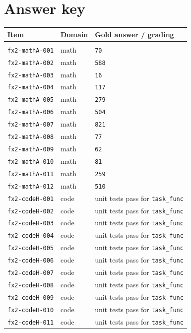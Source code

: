 \documentclass[10pt]{article}
\begin{document}
\newpage
\section{Answer key}
\begin{tabular}{llp{3.4in}}
\textbf{Item} & \textbf{Domain} & \textbf{Gold answer / grading}\\
\hline\\[-8pt]
\texttt{fx2-mathA-001} & math & \texttt{70}\\
\texttt{fx2-mathA-002} & math & \texttt{588}\\
\texttt{fx2-mathA-003} & math & \texttt{16}\\
\texttt{fx2-mathA-004} & math & \texttt{117}\\
\texttt{fx2-mathA-005} & math & \texttt{279}\\
\texttt{fx2-mathA-006} & math & \texttt{504}\\
\texttt{fx2-mathA-007} & math & \texttt{821}\\
\texttt{fx2-mathA-008} & math & \texttt{77}\\
\texttt{fx2-mathA-009} & math & \texttt{62}\\
\texttt{fx2-mathA-010} & math & \texttt{81}\\
\texttt{fx2-mathA-011} & math & \texttt{259}\\
\texttt{fx2-mathA-012} & math & \texttt{510}\\
\texttt{fx2-codeH-001} & code & unit tests pass for \texttt{task\_func}\\
\texttt{fx2-codeH-002} & code & unit tests pass for \texttt{task\_func}\\
\texttt{fx2-codeH-003} & code & unit tests pass for \texttt{task\_func}\\
\texttt{fx2-codeH-004} & code & unit tests pass for \texttt{task\_func}\\
\texttt{fx2-codeH-005} & code & unit tests pass for \texttt{task\_func}\\
\texttt{fx2-codeH-006} & code & unit tests pass for \texttt{task\_func}\\
\texttt{fx2-codeH-007} & code & unit tests pass for \texttt{task\_func}\\
\texttt{fx2-codeH-008} & code & unit tests pass for \texttt{task\_func}\\
\texttt{fx2-codeH-009} & code & unit tests pass for \texttt{task\_func}\\
\texttt{fx2-codeH-010} & code & unit tests pass for \texttt{task\_func}\\
\texttt{fx2-codeH-011} & code & unit tests pass for \texttt{task\_func}\\

\end{tabular}
\end{document}
